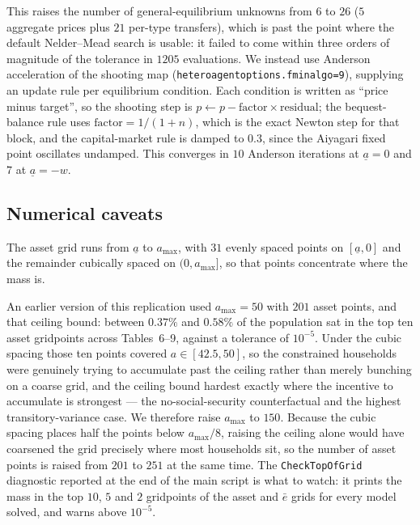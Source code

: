 \documentclass[11pt,fleqn]{article}
\begin{document}
This raises the number of general-equilibrium unknowns from $6$ to $26$ ($5$ aggregate prices plus $21$ per-type transfers), which is past the point where the default Nelder--Mead search is usable: it failed to come within three orders of magnitude of the tolerance in $1205$ evaluations. We instead use Anderson acceleration of the shooting map (\verb|heteroagentoptions.fminalgo=9|), supplying an update rule per equilibrium condition. Each condition is written as ``price minus target'', so the shooting step is $p \leftarrow p - \text{factor} \times \text{residual}$; the bequest-balance rule uses $\text{factor}=1/(1+n)$, which is the exact Newton step for that block, and the capital-market rule is damped to $0.3$, since the Aiyagari fixed point oscillates undamped. This converges in $10$ Anderson iterations at $\underline{a}=0$ and $7$ at $\underline{a}=-w$.

\subsection*{Numerical caveats}

The asset grid runs from $\underline{a}$ to $a_{\max}$, with $31$ evenly spaced points on $[\underline{a},0]$ and the remainder cubically spaced on $(0,a_{\max}]$, so that points concentrate where the mass is.

An earlier version of this replication used $a_{\max}=50$ with $201$ asset points, and that ceiling bound: between $0.37\%$ and $0.58\%$ of the population sat in the top ten asset gridpoints across Tables~6--9, against a tolerance of $10^{-5}$. Under the cubic spacing those ten points covered $a \in [42.5, 50]$, so the constrained households were genuinely trying to accumulate past the ceiling rather than merely bunching on a coarse grid, and the ceiling bound hardest exactly where the incentive to accumulate is strongest --- the no-social-security counterfactual and the highest transitory-variance case. We therefore raise $a_{\max}$ to $150$. Because the cubic spacing places half the points below $a_{\max}/8$, raising the ceiling alone would have coarsened the grid precisely where most households sit, so the number of asset points is raised from $201$ to $251$ at the same time. The \texttt{CheckTopOfGrid} diagnostic reported at the end of the main script is what to watch: it prints the mass in the top $10$, $5$ and $2$ gridpoints of the asset and $\bar{e}$ grids for every model solved, and warns above $10^{-5}$.
\end{document}
